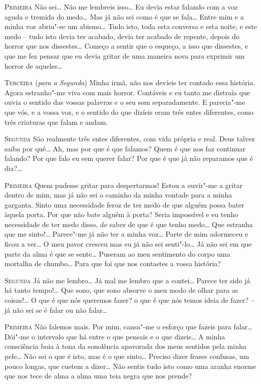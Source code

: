 \textsc{Primeira} Não sei\ldots{} Não me lembreis
isso\ldots{} Eu devia estar falando com
a voz aguda e tremida do medo\ldots{} Mas 
já não sei como é que se fala\ldots{}
Entre mim e a minha voz abriu"-se um 
abismo\ldots{} Tudo isto, toda esta
conversa e esta noite, e este medo -- tudo 
isto devia ter acabado, devia
ter acabado de repente, depois do horror que
nos dissestes\ldots{} Começo a
sentir que o esqueço, a isso que dissestes, 
e que me fez pensar que eu
devia gritar de uma maneira nova para exprimir 
um horror de aqueles\ldots{}

\textsc{Terceira} (\textit{para a Segunda}) Minha irmã, 
não nos devíeis ter contado essa história. 
Agora estranho"-me viva com mais horror.
Contáveis e eu tanto me distraía que ouvia o sentido das vossas
palavras e o seu som separadamente. E parecia"-me 
que vós, e a vossa voz, e o sentido do que dizíeis 
eram três entes diferentes, como três criaturas que falam e andam. 

\textsc{Segunda} São realmente três entes diferentes, 
com vida própria e real.
Deus talvez saiba por quê\ldots{} Ah,
mas por que é que falamos? Quem é que
nos faz continuar falando? Por que falo 
eu sem querer falar? Por que é
que já não reparamos que é dia?\ldots{}

\textsc{Primeira} Quem pudesse gritar para despertarmos!
Estou a ouvir"-me a gritar dentro de mim, mas já não 
sei o caminho da minha vontade para a minha garganta. 
Sinto uma necessidade feroz de ter medo de que alguém
possa bater àquela porta. Por que não bate alguém à porta?
Seria impossível e eu tenho necessidade de ter medo disso,
de saber de que é que tenho medo\ldots{} Que estranha que
me sinto!\ldots{} Parece"-me já não ter a minha voz\ldots{}
Parte de mim adormeceu e ficou a ver\ldots{} O meu pavor
cresceu mas eu já não sei senti"-lo\ldots{} Já não sei em
que parte da alma é que se sente\ldots{} Puseram ao meu
sentimento do corpo uma mortalha de chumbo\ldots{} 
Para que foi que nos contastes a vossa história?

\textsc{Segunda} Já não me lembro\ldots{} Já mal me 
lembro que a contei\ldots{} Parece
ter sido já há tanto tempo!\ldots{} Que sono, 
que sono absorve o meu modo de
olhar para as coisas!\ldots{} O que é que nós 
queremos fazer? o que é que
nós temos ideia de fazer? -- já não sei se é falar
ou não falar\ldots{}

\textsc{Primeira} Não falemos mais. Por mim, cansa"-me 
o esforço que fazeis
para falar\ldots{} Dói"-me o intervalo que há entre
o que pensais e o que
dizeis\ldots{} A minha consciência boia à tona da
sonolência apavorada dos
meus sentidos pela minha pele\ldots{} 
Não sei o que é isto, mas é o que
sinto\ldots{} Preciso dizer frases 
confusas, um pouco longas, que custem a
dizer\ldots{} Não sentis tudo isto como 
uma aranha enorme que nos tece de
alma a alma uma teia negra que nos prende?

